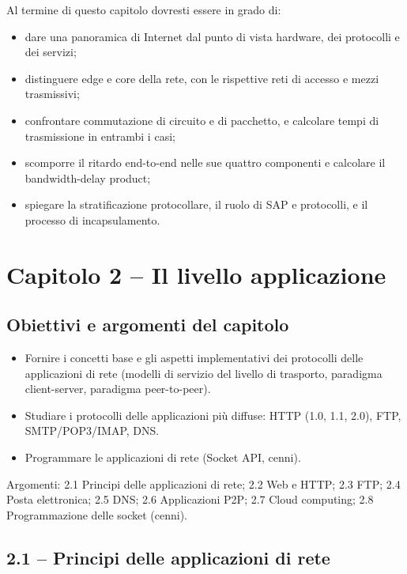 \documentclass[12pt, a4paper]{article}
\begin{document}
Al termine di questo capitolo dovresti essere in grado di:
\begin{itemize}
    \item dare una panoramica di Internet dal punto di vista hardware, dei protocolli e dei servizi;
    \item distinguere edge e core della rete, con le rispettive reti di accesso e mezzi trasmissivi;
    \item confrontare commutazione di circuito e di pacchetto, e calcolare tempi di trasmissione in entrambi i casi;
    \item scomporre il ritardo end-to-end nelle sue quattro componenti e calcolare il bandwidth-delay product;
    \item spiegare la stratificazione protocollare, il ruolo di SAP e protocolli, e il processo di incapsulamento.
\end{itemize}



\section{Capitolo 2 -- Il livello applicazione}

\subsection{Obiettivi e argomenti del capitolo}

\begin{itemize}
    \item Fornire i concetti base e gli aspetti implementativi dei protocolli delle applicazioni di rete (modelli di servizio del livello di trasporto, paradigma client-server, paradigma peer-to-peer).
    \item Studiare i protocolli delle applicazioni più diffuse: HTTP (1.0, 1.1, 2.0), FTP, SMTP/POP3/IMAP, DNS.
    \item Programmare le applicazioni di rete (Socket API, cenni).
\end{itemize}

Argomenti: 2.1 Principi delle applicazioni di rete; 2.2 Web e HTTP; 2.3 FTP; 2.4 Posta elettronica; 2.5 DNS; 2.6 Applicazioni P2P; 2.7 Cloud computing; 2.8 Programmazione delle socket (cenni).

\subsection{2.1 -- Principi delle applicazioni di rete}
\end{document}
